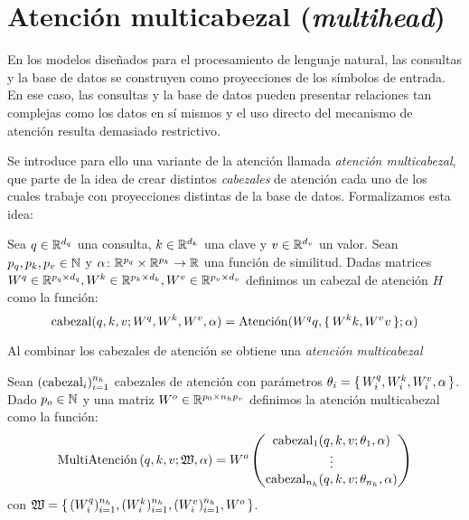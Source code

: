 \section{Atención multicabezal (\textit{multihead})}
En los modelos diseñados para el procesamiento de lenguaje natural, las consultas y la base de datos se construyen como proyecciones de los símbolos de entrada. En ese caso, las consultas y la base de datos pueden presentar relaciones tan complejas como los datos en sí mismos y el uso directo del mecanismo de atención resulta demasiado restrictivo.

Se introduce para ello una variante de la atención llamada \textit{atención multicabezal}, que parte de la idea de crear distintos \textit{cabezales} de atención cada uno de los cuales trabaje con proyecciones distintas de la base de datos. Formalizamos esta idea:

\begin{definition}
    Sea \( q \in \mathbb{R}^{d_q} \) una consulta, \( k \in \mathbb{R}^{d_k} \) una clave y \( v \in \mathbb{R}^{d_v} \) un valor. Sean \( p_q, p_k, p_v \in \mathbb{N} \) y \( \alpha \colon \mathbb{R}^{p_q} \times \mathbb{R}^{p_k} \to \mathbb{R} \) una función de similitud. Dadas matrices \( W^q \in \mathbb{R}^{p_q \times d_q}, W^k \in \mathbb{R}^{p_k \times d_k}, W^v \in \mathbb{R}^{p_v \times d_v} \) definimos un cabezal de atención \( H \) como la función:
    \begin{equation} \label{eq:head}
        \operatorname{cabezal}(q, k, v; W^q, W^k, W^v, \alpha)  = \operatorname{Atenci\acute{o}n}(W^q q, \{\,W^k k,  W^v v \,\}; \alpha)
    \end{equation}
\end{definition}

Al combinar los cabezales de atención se obtiene una \textit{atención multicabezal}
\begin{definition}     
     Sean \( (\operatorname{cabezal}_{i})_{i = 1}^{n_h} \) cabezales de atención con parámetros \( \theta_{i} = \{\, W^q_{i}, W^k_{i}, W^v_{i}, \alpha \,\} \). Dado \( p_o \in \mathbb{N} \) y una matriz \( W^o \in \mathbb{R}^{p_0 \times n_h p_v} \) definimos la atención multicabezal como la función:
     \[
        \operatorname{MultiAtenci\acute{o}n} \left(q, k, v; \mathfrak{W}, \alpha \right) = W^o \begin{pmatrix} \operatorname{cabezal}_{1}(q, k, v; \theta_{1}, \alpha) \\ \vdots \\ \operatorname{cabezal}_{n_h}(q, k, v; \theta_{n_h}, \alpha) \end{pmatrix}
     \]
     con \( \mathfrak{W} = \{\, (W^q_{i})_{i = 1}^{n_h}, (W^k_{i})_{i = 1}^{n_h}, (W^v_{i})_{i = 1}^{n_h}, W^o\,\} \).
\end{definition}

